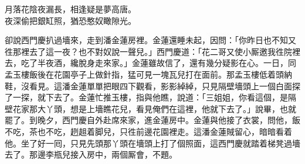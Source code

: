 \begin{myquote}
月落花陰夜漏長，相逢疑是夢高唐。\\夜深偷把銀缸照，猶恐憨奴瞰隙光。
\end{myquote}

卻說西門慶扒過墻來，走到潘金蓮房裡。金蓮還睡未起，因問：「你昨日也不知又徃那裡去了這一夜？也不對奴說一聲兒。」西門慶道：「花二哥又使小厮邀我徃院裡去，吃了半夜酒，纔脫身走來家。」金蓮雖故信了，還有幾分疑影在心。一日，同孟玉樓飯後在花園亭子上做針指，猛可見一塊瓦兒打在面前。那孟玉樓低着頭納鞋，沒看見。這潘金蓮單單把眼四下觀看，影影綽綽，只見隔壁墻頭上一個白面探了一探，就下去了。金蓮忙推玉樓，指與他瞧，說道：「三姐姐，你看這個，是隔壁花家那大丫頭，想是上墻瞧花兒，看見俺們在這裡，他就下去了。」說畢，也就罷了。到晚夕，西門慶自外赴席來家，進金蓮房中。金蓮與他接了衣裳，問他，飯不吃，茶也不吃，趔趄着脚兒，只徃前邊花園裡走。{}這潘金蓮賊留心，暗暗看着他。坐了好一囘，只見先頭那丫頭在墻頭上打了個照面，這西門慶就踏着梯凳過墻去了。那邊李瓶兒接入房中，兩個厮會，不題。

